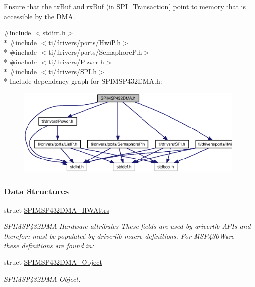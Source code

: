 Ensure that the tx\+Buf and rx\+Buf (in \hyperlink{struct_s_p_i___transaction}{S\+P\+I\+\_\+\+Transaction}) point to memory that is accessible by the D\+M\+A. 

{\ttfamily \#include $<$stdint.\+h$>$}\\*
{\ttfamily \#include $<$ti/drivers/ports/\+Hwi\+P.\+h$>$}\\*
{\ttfamily \#include $<$ti/drivers/ports/\+Semaphore\+P.\+h$>$}\\*
{\ttfamily \#include $<$ti/drivers/\+Power.\+h$>$}\\*
{\ttfamily \#include $<$ti/drivers/\+S\+P\+I.\+h$>$}\\*
Include dependency graph for S\+P\+I\+M\+S\+P432\+D\+M\+A.\+h\+:
\nopagebreak
\begin{figure}[H]
\begin{center}
\leavevmode
\includegraphics[width=350pt]{_s_p_i_m_s_p432_d_m_a_8h__incl}
\end{center}
\end{figure}
\subsubsection*{Data Structures}
\begin{DoxyCompactItemize}
\item 
struct \hyperlink{struct_s_p_i_m_s_p432_d_m_a___h_w_attrs}{S\+P\+I\+M\+S\+P432\+D\+M\+A\+\_\+\+H\+W\+Attrs}
\begin{DoxyCompactList}\small\item\em S\+P\+I\+M\+S\+P432\+D\+M\+A Hardware attributes These fields are used by driverlib A\+P\+Is and therefore must be populated by driverlib macro definitions. For M\+S\+P430\+Ware these definitions are found in\+: \end{DoxyCompactList}\item 
struct \hyperlink{struct_s_p_i_m_s_p432_d_m_a___object}{S\+P\+I\+M\+S\+P432\+D\+M\+A\+\_\+\+Object}
\begin{DoxyCompactList}\small\item\em S\+P\+I\+M\+S\+P432\+D\+M\+A Object. \end{DoxyCompactList}\end{DoxyCompactItemize}
